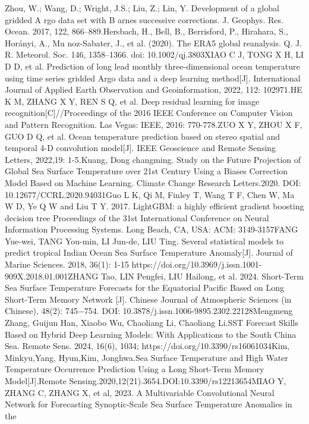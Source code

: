 \documentclass[
  12pt,
]{article}
\begin{document}
Zhou, W.; Wang, D.; Wright, J.S.; Liu, Z.; Lin, Y. Development of a
global gridded A rgo data set with B arnes successive corrections. J.
Geophys. Res. Ocean. 2017, 122, 866--889.Hersbach, H., Bell, B.,
Berrisford, P., Hirahara, S., Horányi, A., Mu noz-Sabater, J., et al.
(2020). The ERA5 global reanalysis. Q. J. R. Meteorol. Soc. 146,
1358--1366. doi: 10.1002/qj.3803XIAO C J, TONG X H, LI D D, et al.
Prediction of long lead monthly three-dimensional ocean temperature
using time series gridded Argo data and a deep learning method{[}J{]}.
International Journal of Applied Earth Observation and Geoinformation,
2022, 112: 102971.HE K M, ZHANG X Y, REN S Q, et al. Deep residual
learning for image recognition{[}C{]}//Proceedings of the 2016 IEEE
Conference on Computer Vision and Pattern Recognition. Las Vegas: IEEE,
2016: 770-778.ZUO X Y, ZHOU X F, GUO D Q, et al. Ocean temperature
prediction based on stereo spatial and temporal 4-D convolution
model{[}J{]}. IEEE Geoscience and Remote Sensing Letters, 2022,19:
1-5.Kuang, Dong changming. Study on the Future Projection of Global Sea
Surface Temperature over 21st Century Using a Biases Correction Model
Based on Machine Learning. Climate Change Research Letters.2020. DOI:
10.12677/CCRL.2020.94031Guo L K, Qi M, Finley T, Wang T F, Chen W, Ma W
D, Ye Q W and Liu T Y. 2017. LightGBM: a highly efficient gradient
boosting decision tree Proceedings of the 31st International Conference
on Neural Information Processing Systems. Long Beach, CA, USA: ACM:
3149-3157FANG Yue-wei, TANG You-min, LI Jun-de, LIU Ting. Several
statistical models to predict tropical Indian Ocean Sea Surface
Temperature Anomaly{[}J{]}. Journal of Marine Sciences. 2018, 36(1):
1-15 https://doi.org/10.3969/j.issn.1001-909X.2018.01.001ZHANG Tao, LIN
Pengfei, LIU Hailong, et al. 2024. Short-Term Sea Surface Temperature
Forecasts for the Equatorial Pacific Based on Long Short-Term Memory
Network {[}J{]}. Chinese Journal of Atmospheric Sciences (in Chinese),
48(2): 745−754. DOI: 10.3878/j.issn.1006-9895.2302.22128Mengmeng Zhang,
Guijun Han, Xiaobo Wu, Chaoliang Li, Chaoliang Li.SST Forecast Skills
Based on Hybrid Deep Learning Models: With Applications to the South
China Sea. Remote Sens. 2024, 16(6), 1034;
https://doi.org/10.3390/rs16061034Kim, Minkyu,Yang, Hyun,Kim,
Jonghwa.Sea Surface Temperature and High Water Temperature Occurrence
Prediction Using a Long Short-Term Memory Model{[}J{]}.Remote
Sensing.2020,12(21).3654.DOI:10.3390/rs12213654MIAO Y, ZHANG C, ZHANG X,
et al, 2023. A Multivariable Convolutional Neural Network for
Forecasting Synoptic-Scale Sea Surface Temperature Anomalies in the
\end{document}
